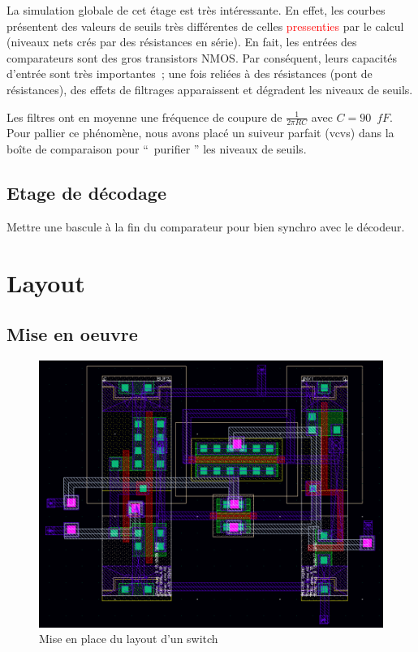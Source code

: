 \documentclass[11pt]{article}
\begin{document}
La simulation globale de cet \'etage est tr\`es int\'eressante. En effet, les courbes pr\'esentent des valeurs de
seuils tr\`es diff\'erentes de celles \textcolor{red}{pressenties} par le calcul (niveaux nets cr\'es par des r\'esistances en s\'erie).
En fait, les entr\'ees des comparateurs sont des gros transistors NMOS. Par cons\'equent, leurs capacit\'es d'entr\'ee
sont tr\`es importantes ; une fois reli\'ees \`a des r\'esistances (pont de r\'esistances), des effets de filtrages
apparaissent et d\'egradent les niveaux de seuils.

Les filtres ont en moyenne une fr\'equence de coupure de $\frac{1}{2 \pi R C}$ avec $C  = 90 \phantom{2} fF.$
Pour pallier ce ph\'enom\`ene, nous avons plac\'e un suiveur parfait (vcvs) dans la bo\^ite de comparaison pour
`` purifier '' les niveaux de seuils.

\subsection{Etage de d\'ecodage}

Mettre une bascule \`a la fin du comparateur pour bien synchro avec le d\'ecodeur.

\clearpage

\section{Layout}
\subsection{Mise en oeuvre}

\begin{figure}[!htb]
      \centering
      \includegraphics[width=0.6\linewidth]{layout_.png}
      \caption{Mise en place du layout d'un switch}
\end{figure}%

\clearpage
\end{document}
